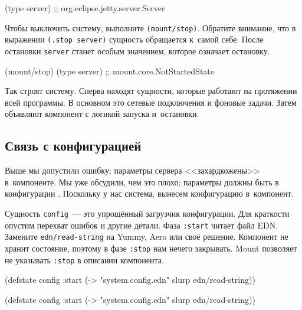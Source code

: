\begin{english}
  \begin{clojure}
(type server)
;; org.eclipse.jetty.server.Server
  \end{clojure}
\end{english}

Чтобы выключить систему, выполните \verb|(mount/stop)|. Обратите внимание, что в
выражении \verb|(.stop server)| сущность обращается к~самой себе. После
остановки \verb|server| станет особым значением, которое означает остановку.

\begin{english}
  \begin{clojure}
(mount/stop)
(type server)
;; mount.core.NotStartedState
  \end{clojure}
\end{english}

Так строят систему. Сперва находят сущности, которые работают на протяжении всей
программы. В основном это сетевые подключения и фоновые задачи. Затем объявляют
компонент с логикой запуска и~остановки.

\subsection{Связь с конфигурацией}

Выше мы допустили ошибку: параметры сервера <<захардкожены>> в~компоненте. Мы
уже обсудили, чем это плохо; параметры должны быть в
конфигурации . Поскольку у нас система, вынесем конфигурацию
в~компонент.


Сущность \verb|config|~--- это упрощённый загрузчик конфигурации. Для краткости
опустим перехват ошибок и другие детали. Фаза \verb|:start| читает файл
EDN. Замените \texttt{edn/read\--string} на Yummy, Aero или своё
решение. Компонент не хранит состояние, поэтому в фазе \verb|:stop| нам нечего
закрывать. Mount позволяет не указывать \verb|:stop| в описании компонента.

\ifnarrow

\begin{english}
  \begin{clojure}
(defstate config
  :start
  (-> "system.config.edn"
      slurp
      edn/read-string))
  \end{clojure}
\end{english}

\else

\begin{english}
  \begin{clojure}
(defstate config
  :start
  (-> "system.config.edn" slurp edn/read-string))
  \end{clojure}
\end{english}


